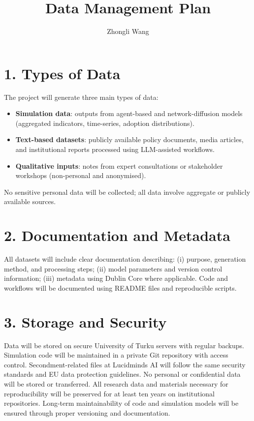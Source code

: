 \documentclass{nfr}
\title{Data Management Plan}
\author{Zhongli Wang}
\begin{document}
\maketitle

\section*{1. Types of Data}

The project will generate three main types of data:
\begin{itemize}
    \item \textbf{Simulation data}: outputs from agent-based and network-diffusion models (aggregated indicators, time-series, adoption distributions).
    \item \textbf{Text-based datasets}: publicly available policy documents, media articles, and institutional reports processed using LLM-assisted workflows.
    \item \textbf{Qualitative inputs}: notes from expert consultations or stakeholder workshops (non-personal and anonymised).
\end{itemize}
No sensitive personal data will be collected; all data involve aggregate or publicly available sources.

\section*{2. Documentation and Metadata}

All datasets will include clear documentation describing: (i) purpose, generation method, and processing steps; (ii) model parameters and version control information; (iii) metadata using Dublin Core where applicable.
Code and workflows will be documented using README files and reproducible scripts.

\section*{3. Storage and Security}

Data will be stored on secure University of Turku servers with regular backups.  
Simulation code will be maintained in a private Git repository with access control.  
Secondment-related files at Lucidminds AI will follow the same security standards and EU data protection guidelines.  
No personal or confidential data will be stored or transferred.
All research data and materials necessary for reproducibility will be preserved for at least ten years on institutional repositories. Long-term maintainability of code and simulation models will be ensured through proper versioning and documentation.
\end{document}
